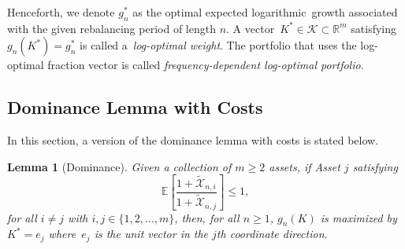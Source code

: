 \documentclass[10pt]{article} %
\newtheorem{lemma}{Lemma}[section]
\begin{document}
	
	
	Henceforth, we denote  $g_n^*$ as the  optimal expected logarithmic~growth associated with the given rebalancing period of length $n$. 
	A vector~{$K^* \in \mathcal{K} \subset \mathbb{R}^m$} satisfying~$g_n(K^*) = g_n^*$ is called a~\textit{log-optimal weight}. 
	The portfolio that uses the log-optimal fraction vector is called \textit{frequency-dependent log-optimal portfolio}. 
	
	
	\subsection{Dominance Lemma with Costs} \label{section: Dominance lemma with Costs}
	In this section, a version of the dominance lemma with costs is stated below.
	
	\begin{lemma}[Dominance] \label{lemma: dominance theorem with costs}
		Given a collection of $m\geq 2$ assets, if Asset $j$ satisfying
		$$
		\mathbb{E} \left[ \frac{ 1+\widetilde{\mathcal{X}}_{n,i}}{ 1+ \widetilde{\mathcal{X}}_{n,j}} \right] \leq 1,
		$$ for all $i \neq j$ with $i,j \in \{1,2,\dots,m\}$,
		then, for all $n\geq 1$, $g_n(K)$ is maximized by
		$
		K^* = e_j
		$
		where~$e_j$ is the unit vector in the $j$th coordinate direction. 
	\end{lemma}
	
\end{document}
